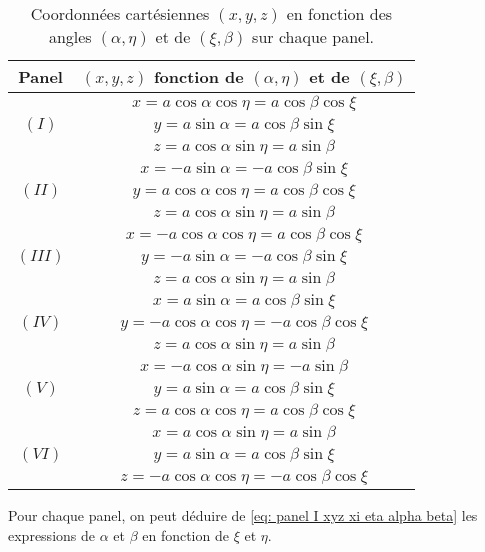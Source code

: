 \begin{table}[htbp]
\begin{center}
\begin{tabular}{|c|c|}
\hline
\textbf{Panel} & $(x,y,z)$ \textbf{fonction de} $(\alpha, \eta)$ \textbf{et de} $(\xi, \beta)$ \\

\hline
\hline
    & $x=a \cos \alpha \cos \eta  =  a \cos \beta \cos \xi$ \\ 
$(I)$ & $y=a \sin \alpha  =  a \cos \beta \sin \xi$ \\
    & $z=a \cos \alpha \sin \eta  =  a \sin \beta$ \\
\hline
\hline
      & $x=- a \sin \alpha  = - a \cos \beta \sin \xi$ \\ 
$(II)$  & $y=a \cos \alpha \cos \eta  =  a \cos \beta \cos \xi$ \\
      & $z=a \cos \alpha \sin \eta  =  a \sin \beta$ \\
\hline
\hline
      & $x=- a \cos \alpha \cos \eta = a \cos \beta \cos \xi$ \\ 
$(III)$ & $y=- a \sin \alpha = - a \cos \beta \sin \xi$ \\
      & $z=a \cos \alpha \sin \eta = a \sin \beta$ \\
\hline
\hline
      & $x=a \sin \alpha = a \cos \beta \sin \xi$ \\ 
$(IV)$  & $y=- a \cos \alpha \cos \eta = - a \cos \beta \cos \xi$ \\
      & $z=a \cos \alpha \sin \eta = a \sin \beta$ \\
\hline
\hline
    & $x=-a \cos \alpha \sin \eta = - a \sin \beta$ \\ 
$(V)$ & $y=a \sin \alpha = a \cos \beta \sin \xi$ \\
    & $z=a \cos \alpha \cos \eta = a \cos \beta \cos \xi$ \\
\hline
\hline
     & $x=a \cos \alpha \sin \eta = a \sin \beta$ \\ 
$(VI)$ & $y=a \sin \alpha = a \cos \beta \sin \xi$ \\
     & $z=- a \cos \alpha \cos \eta = - a \cos \beta \cos \xi$ \\
\hline
\end{tabular}
\end{center}
\caption{Coordonnées cartésiennes $(x,y,z)$ en fonction des angles $(\alpha, \eta)$ et de $(\xi, \beta)$  sur chaque panel.}
\label{tab: x y z fct de xi eta alfa beta}
\end{table}
Pour chaque panel, on peut déduire de \eqref{eq: panel I xyz xi eta alpha beta} les expressions de $\alpha$ et $\beta$ en fonction de $\xi$ et $\eta$. 

